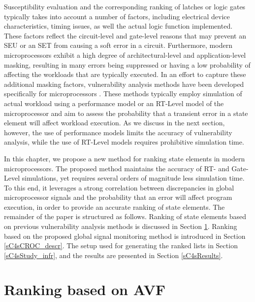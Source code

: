 \documentclass[12pt]{yalephd}
\begin{document}
Susceptibility evaluation and the corresponding ranking of latches or logic gates typically takes into account a number of factors, including electrical device characteristics, timing issues, as well the actual logic function implemented. These factors reflect the circuit-level and gate-level reasons that may prevent an SEU or an SET from causing a soft error in a circuit. Furthermore, modern microprocessors exhibit a high degree of architectural-level and application-level masking, resulting in many errors being suppressed or having a low probability of affecting the workloads that are typically executed. In an effort to capture these additional masking factors, vulnerability analysis methods have been developed specifically for microprocessors \cite{MWERA03,WMP07,CzSi90,KiSo02}. These methods typically employ simulation of actual workload using a performance model or an RT-Level model of the microprocessor and aim to assess the probability that a transient error in a state element will affect workload execution. As we discuss in the next section, however, the use of performance models limits the accuracy of vulnerability analysis, while the use of RT-Level models requires prohibitive simulation time.

In this chapter, we propose a new method for ranking state elements in modern microprocessors. The proposed method maintains the accuracy of RT- and Gate-Level simulations, yet requires several orders of magnitude less simulation time. To this end, it leverages a strong correlation between discrepancies in global microprocessor signals and the probability that an error will affect program execution, in order to provide an accurate ranking of state elements. The remainder of the paper is structured as follows. Ranking of state elements based on previous vulnerability analysis methods is discussed in Section \ref{sC4sAVF}. Ranking based on the proposed global signal monitoring method is introduced in Section \ref{sC4sCROC_descr}. The setup used for generating the ranked lists in Section \ref{sC4sStudy_infr}, and the results are presented in Section \ref{sC4sResults}.

\section{Ranking based on AVF} \label{sC4sAVF}
\end{document}
